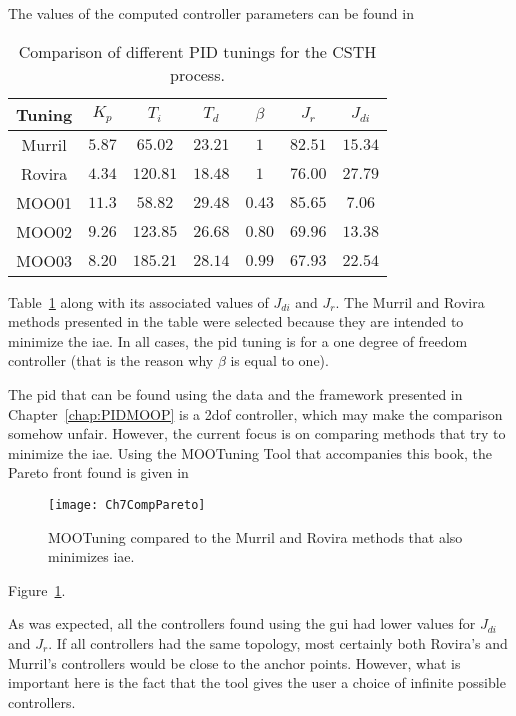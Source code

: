 The values of the computed controller parameters can be found in %
\begin{table}[tb]
	\centering
	\caption{Comparison of different PID tunings for the CSTH process.}
	\setlength{\tabcolsep}{8pt}
	\begin{tabular}{ccccccc}
		\toprule
		Tuning 	& $K_p$ 	& $T_i$		& $T_d$		& $\beta$	& $J_{r}$	& $J_{di}$\\
		\midrule
		Murril	& $5.87$	& $65.02$	& $23.21$	& $1$			& $82.51$	& $15.34$\\
		Rovira	& $4.34$	& $120.81$	& $18.48$	& $1$			& $76.00$	& $27.79$\\
		MOO01	& $11.3$	& $58.82$	& $29.48$	& $0.43$		& $85.65$	& $7.06$\\
		MOO02	& $9.26$	& $123.85$	& $26.68$	& $0.80$		& $69.96$	& $13.38$\\
		MOO03	& $8.20$	& $185.21$	& $28.14$	& $0.99$		& $67.93$	& $22.54$\\
		\bottomrule
	\end{tabular}
	\label{tab:CompPIDCSTH}
\end{table}
%
Table~\ref{tab:CompPIDCSTH} along with its associated values of $J_{di}$ and $J_r$. The Murril and Rovira methods presented in the table were selected because they are intended to minimize the \gls{iae}. In all cases, the \gls{pid} tuning is for a one degree of freedom controller (that is  the reason why $\beta$ is equal to one).

The \gls{pid} that can be found using the data and the framework presented in Chapter~\ref{chap:PIDMOOP} is a \gls{2dof} controller, which may make the comparison somehow unfair. However, the current focus is on comparing methods that try to minimize the \gls{iae}. Using the MOOTuning Tool that accompanies this book, the Pareto front found is given in %
%
\begin{figure}[tb]
	\centering
	\texttt{[image: Ch7CompPareto]}
	\caption{MOOTuning compared to the Murril and Rovira methods that also minimizes \gls{iae}.}
	\label{fig:Ch7CompPareto}
\end{figure}
%
Figure~\ref{fig:Ch7CompPareto}.

As was expected, all the controllers found using the \gls{gui} had lower values for $J_{di}$ and $J_r$. If all controllers had the same topology, most certainly both Rovira's and Murril's controllers would be close to the anchor points. However, what is important here is the fact that the tool gives the user a choice of infinite possible controllers.

